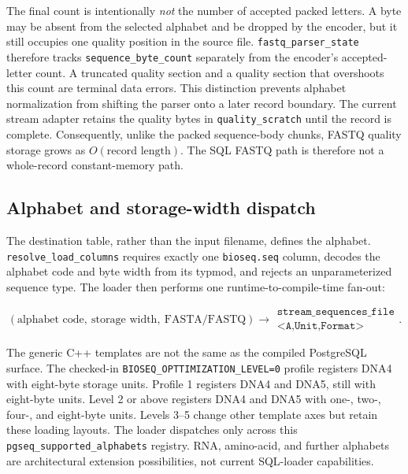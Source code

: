 The final count is intentionally \emph{not} the number of accepted packed
letters.  A byte may be absent from the selected alphabet and be dropped by the
encoder, but it still occupies one quality position in the source file.
\texttt{fastq\_\allowbreak parser\_\allowbreak state} therefore tracks
\texttt{sequence\_\allowbreak byte\_\allowbreak count} separately from the
encoder's accepted-letter
count.  A truncated quality section and a quality section that overshoots this
count are terminal data errors.  This distinction prevents alphabet
normalization from shifting the parser onto a later record boundary.
The current stream adapter retains the quality bytes in
\texttt{quality\_scratch} until the record is complete.  Consequently, unlike
the packed sequence-body chunks, FASTQ quality storage grows as
\(O(\text{record length})\).  The SQL FASTQ path is therefore not a
whole-record constant-memory path.

\subsection{Alphabet and storage-width dispatch}

The destination table, rather than the input filename, defines the alphabet.
\texttt{resolve\_\allowbreak load\_\allowbreak columns} requires exactly one
\texttt{bioseq.seq} column, decodes the alphabet code and byte width from its
typmod, and rejects an unparameterized sequence type. The loader then performs
one runtime-to-compile-time fan-out:

\[
  (\text{alphabet code},\ \text{storage width},\ \text{FASTA/FASTQ})
  \longrightarrow
  \begin{gathered}
    \texttt{stream\_sequences\_file}\\[-0.2ex]
    \texttt{<A,Unit,Format>}
  \end{gathered}.
\]

The generic C++ templates are not the same as the compiled PostgreSQL surface.
The checked-in \texttt{BIOSEQ\_OPTTIMIZATION\_LEVEL=0} profile registers DNA4
with eight-byte storage units. Profile 1 registers DNA4 and DNA5, still with
eight-byte units. Level 2 or above registers DNA4 and DNA5 with one-, two-,
four-, and eight-byte units. Levels 3--5 change other template axes but retain
these loading layouts. The loader dispatches only across this
\texttt{pgseq\_supported\_alphabets} registry. RNA, amino-acid, and further
alphabets are architectural extension possibilities, not current SQL-loader
capabilities.

